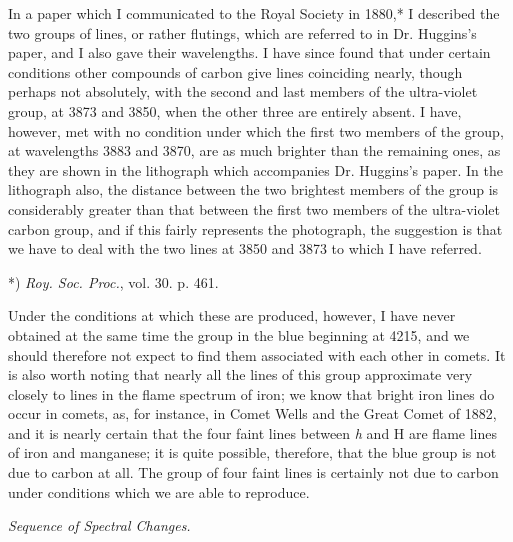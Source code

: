 \documentclass[a4paper, 12pt, oneside, polutonikogreek, english]{article}
\begin{document}
In a paper which I communicated to the Royal Society in 1880,* I described the two groups of lines, or rather flutings, which are referred to in Dr. Huggins's paper, and I also gave their wavelengths. I have since found that under certain conditions other compounds of carbon give lines coinciding nearly, though perhaps not absolutely, with the second and last members of the ultra-violet group, at 3873 and 3850, when the other three are entirely absent. I have, however, met with no condition under which the first two members of the group, at wavelengths 3883 and 3870, are as much brighter than the remaining ones, as they are shown in the lithograph which accompanies Dr. Huggins's paper. In the lithograph also, the distance between the two brightest members of the group is considerably greater than that between the first two members of the ultra-violet carbon group, and if this fairly represents the photograph, the suggestion is that we have to deal with the two lines at 3850 and 3873 to which I have referred.

*) \emph{Roy. Soc. Proc.}, vol. 30. p. 461.

Under the conditions at which these are produced, however, I have never obtained at the same time the group in the blue beginning at 4215, and we should therefore not expect to find them associated with each other in comets. It is also worth noting that nearly all the lines of this group approximate very closely to lines in the flame spectrum of iron; we know that bright iron lines do occur in comets, as, for instance, in Comet Wells and the Great Comet of 1882, and it is nearly certain that the four faint lines between \emph{h} and H are flame lines of iron and manganese; it is quite possible, therefore, that the blue group is not due to carbon at all. The group of four faint lines is certainly not due to carbon under conditions which we are able to reproduce.

\emph{Sequence of Spectral Changes.}
\end{document}
